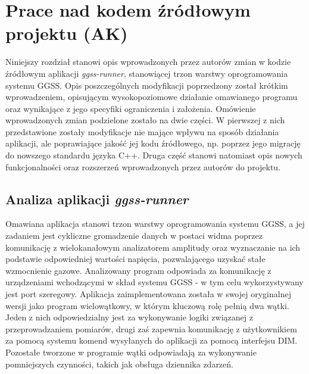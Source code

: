 \chapter{Prace nad kodem źródłowym projektu (AK)}
\label{cha:code}

\graphicspath{{5_code/static/}}

Niniejszy rozdział stanowi opis wprowadzonych przez autorów zmian w kodzie źródłowym aplikacji \emph{ggss-runner}, stanowiącej trzon warstwy oprogramowania systemu GGSS. Opis poszczególnych modyfikacji poprzedzony został krótkim wprowadzeniem, opisującym wysokopoziomowe działanie omawianego programu oraz wynikające z jego specyfiki ograniczenia i założenia. Omówienie wprowadzonych zmian podzielone zostało na dwie części. W pierwszej z nich przedstawione zostały modyfikacje nie mające wpływu na sposób działania aplikacji, ale poprawiające jakość jej kodu źródłowego, np. poprzez jego migrację do nowszego standardu języka C++. Druga część stanowi natomiast opis nowych funkcjonalności oraz rozszerzeń wprowadzonych przez autorów do projektu. 

\section{Analiza aplikacji \emph{ggss-runner}}
Omawiana aplikacja stanowi trzon warstwy oprogramowania systemu GGSS, a jej zadaniem jest cykliczne gromadzenie danych w postaci widma poprzez komunikację z wielokanałowym analizatorem amplitudy oraz wyznaczanie na ich podstawie odpowiedniej wartości napięcia, pozwalającego uzyskać stałe wzmocnienie gazowe. Analizowany program odpowiada za komunikację z urządzeniami wchodzącymi w skład systemu GGSS - w tym celu wykorzystywany jest port szeregowy. Aplikacja zaimplementowana została w swojej oryginalnej wersji jako program wielowątkowy, w którym kluczową rolę pełnią dwa wątki. Jeden z nich odpowiedzialny jest za wykonywanie logiki związanej z przeprowadzaniem pomiarów, drugi zaś zapewnia komunikację z użytkownikiem za pomocą systemu komend wysyłanych do aplikacji za pomocą interfejsu DIM. Pozostałe tworzone w programie wątki odpowiadają za wykonywanie pomniejszych czynności, takich jak obsługa dziennika zdarzeń.

